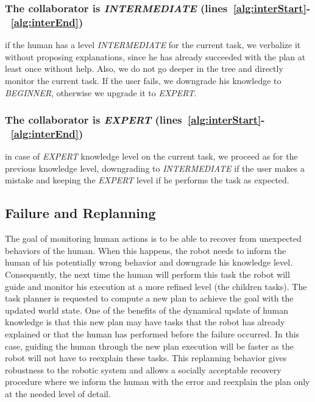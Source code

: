 \subsubsection{The collaborator is \textit{INTERMEDIATE} (lines~\ref{alg:interStart}-~\ref{alg:interEnd})} if the human has a level \textit{INTERMEDIATE} for the current task, we verbalize it without proposing explanations, since he has already  succeeded with the plan at least once without help. Also, we do not go deeper in the tree and directly monitor the current task. If the user  fails, we downgrade his knowledge to \textit{BEGINNER}, otherwise we upgrade it to \textit{EXPERT}.

\subsubsection{The collaborator is \textit{EXPERT} (lines~\ref{alg:interStart}-~\ref{alg:interEnd})} in case of \textit{EXPERT} knowledge level on the current task, we  proceed as for the previous knowledge level, downgrading to \textit{INTERMEDIATE} if the user makes a mistake and keeping the \textit{EXPERT} level if he performs the task as expected.

\subsection{Failure and Replanning}
The goal of monitoring human actions is to be able to recover from unexpected behaviors of the human. When this happens, the robot needs to inform the human of his potentially wrong behavior and downgrade his knowledge level. Consequently, the next time the human will perform this task the robot will guide and monitor his execution at a more refined level (the children tasks).
The task planner is requested to compute a new plan to achieve the goal with the updated world state.
One of the benefits of the dynamical update of human knowledge is that this new plan may have tasks that the robot has already explained or that the human has performed before the failure occurred. In this case, guiding the human through the new plan execution will be faster as the robot will not have to reexplain these tasks. 
This replanning behavior gives robustness to the robotic system and allows a socially acceptable recovery procedure where we inform the human with the error and reexplain the plan only at the needed level of detail.

